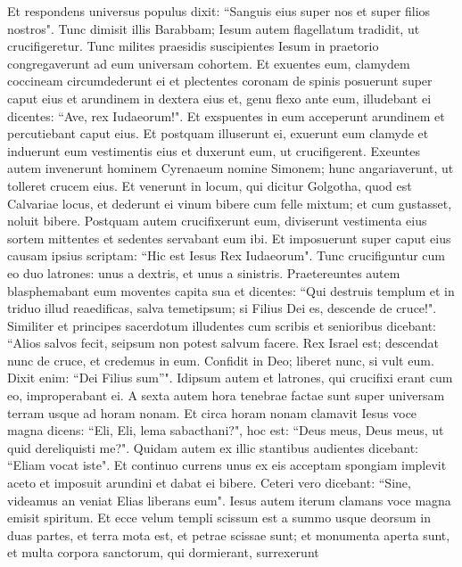 \begin{biblechapter}
\verse Et respondens universus populus dixit: “Sanguis eius super nos et super filios nostros". 
\verse Tunc dimisit illis Barabbam; Iesum autem flagellatum tradidit, ut crucifigeretur. 
\verse Tunc milites praesidis suscipientes Iesum in praetorio congregaverunt ad eum universam cohortem. 
\verse Et exuentes eum, clamydem coccineam circumdederunt ei  
\verse et plectentes coronam de spinis posuerunt super caput eius et arundinem in dextera eius et, genu flexo ante eum, illudebant ei dicentes: “Ave, rex Iudaeorum!". 
\verse Et exspuentes in eum acceperunt arundinem et percutiebant caput eius. 
\verse Et postquam illuserunt ei, exuerunt eum clamyde et induerunt eum vestimentis eius et duxerunt eum, ut crucifigerent. 
\verse Exeuntes autem invenerunt hominem Cyrenaeum nomine Simonem; hunc angariaverunt, ut tolleret crucem eius. 
\verse Et venerunt in locum, qui dicitur Golgotha, quod est Calvariae locus, 
\verse et dederunt ei vinum bibere cum felle mixtum; et cum gustasset, noluit bibere. 
\verse Postquam autem crucifixerunt eum, diviserunt vestimenta eius sortem mittentes 
\verse et sedentes servabant eum ibi. 
\verse Et imposuerunt super caput eius causam ipsius scriptam: “Hic est Iesus Rex Iudaeorum". 
\verse Tunc crucifiguntur cum eo duo latrones: unus a dextris, et unus a sinistris. 
\verse Praetereuntes autem blasphemabant eum moventes capita sua 
\verse et dicentes: “Qui destruis templum et in triduo illud reaedificas, salva temetipsum; si Filius Dei es, descende de cruce!". 
\verse Similiter et principes sacerdotum illudentes cum scribis et senioribus dicebant: 
\verse “Alios salvos fecit, seipsum non potest salvum facere. Rex Israel est; descendat nunc de cruce, et credemus in eum. 
\verse Confidit in Deo; liberet nunc, si vult eum. Dixit enim: “Dei Filius sum”". 
\verse Idipsum autem et latrones, qui crucifixi erant cum eo, improperabant ei. 
\verse A sexta autem hora tenebrae factae sunt super universam terram usque ad horam nonam. 
\verse Et circa horam nonam clamavit Iesus voce magna dicens: “Eli, Eli, lema sabacthani?", hoc est: “Deus meus, Deus meus, ut quid dereliquisti me?".  
\verse Quidam autem ex illic stantibus audientes dicebant: “Eliam vocat iste".  
\verse Et continuo currens unus ex eis acceptam spongiam implevit aceto et imposuit arundini et dabat ei bibere. 
\verse Ceteri vero dicebant: “Sine, videamus an veniat Elias liberans eum". 
\verse Iesus autem iterum clamans voce magna emisit spiritum. 
\verse Et ecce velum templi scissum est a summo usque deorsum in duas partes, et terra mota est, et petrae scissae sunt; 
\verse et monumenta aperta sunt, et multa corpora sanctorum, qui dormierant, surrexerunt 

\end{biblechapter}
